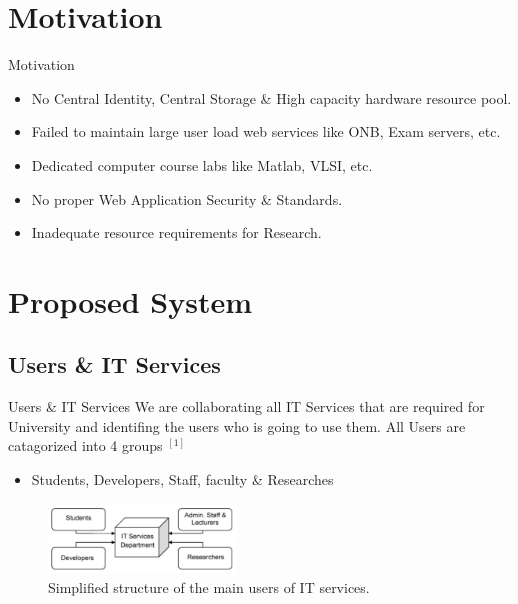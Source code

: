 \documentclass[10pt,xcolor=dvipsnames]{beamer}
\begin{document}
\section{Motivation}
\begin{frame}{Motivation}

\begin{itemize}
	\item No Central Identity, Central Storage \& High capacity hardware resource pool.
	\item Failed to maintain large user load web services like ONB, Exam servers, etc.
	\item Dedicated computer course labs like Matlab, VLSI, etc.
	\item No proper Web Application Security \& Standards.
	\item Inadequate resource requirements for Research.
\end{itemize}

\end{frame}



\section{Proposed System}
\subsection{Users \& IT Services}
\begin{frame}{Users \& IT Services}
We are collaborating all IT Services that are required for University and identifing the users who is going to use them. All Users are catagorized into 4 groups $ ^{[1]}$
	
	\begin{itemize}
	\item Students, Developers, Staff, faculty \& Researches
	\end{itemize}
\begin{figure}[H]
\begin{center}
\includegraphics[width=5cm]{./it.png}
\caption{ Simplified structure of the main users of IT services. \label{fig:Simplified structure of the main users of IT services. }}
\end{center}
\end{figure}
	
\end{frame}
\end{document}
